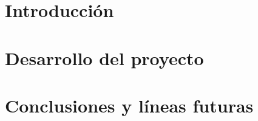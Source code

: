\documentclass[12pt,a4paper]{book} %
\begin{document}
\frontmatter

\renewcommand{\pfcauthorname}{Raúl Gómez Acuña}
\renewcommand{\pfctitlename}{SISTEMA DE MONITORIZACIÓN WEB DEL SISTEMA CARDIOVASCULAR MEDIANTE EL USO DEL PROTOCOLO BLUETOOTH 4.0 DE BAJA ENERGÍA}%
\renewcommand{\pfctutorname}{Álvaro Durán Martínez}
\renewcommand{\pfcanno}{2015}

%















\mainmatter

%

\part{Introducción}




\part{Desarrollo del proyecto}







\part{Conclusiones y líneas futuras}

\end{document}
